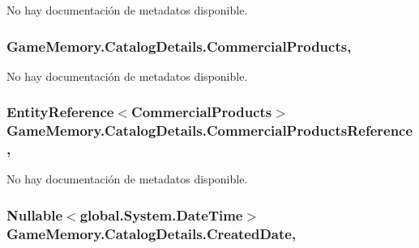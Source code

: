 No hay documentación de metadatos disponible. 

\hypertarget{class_game_memory_1_1_catalog_details_a569b5d7f57651aa9658a60e55bf0ca35}{
\subsubsection[{Commercial\-Products}]{ Game\-Memory.\-Catalog\-Details.\-Commercial\-Products\hspace{0.3cm}{\ttfamily [get]}, {\ttfamily [set]}}}\label{class_game_memory_1_1_catalog_details_a569b5d7f57651aa9658a60e55bf0ca35}


No hay documentación de metadatos disponible. 

\hypertarget{class_game_memory_1_1_catalog_details_a012479cf343ddfd153da97312c957877}{
\subsubsection[{Commercial\-Products\-Reference}]{\setlength{\rightskip}{0pt plus 5cm}Entity\-Reference$<${\bf Commercial\-Products}$>$ Game\-Memory.\-Catalog\-Details.\-Commercial\-Products\-Reference\hspace{0.3cm}{\ttfamily [get]}, {\ttfamily [set]}}}\label{class_game_memory_1_1_catalog_details_a012479cf343ddfd153da97312c957877}


No hay documentación de metadatos disponible. 

\hypertarget{class_game_memory_1_1_catalog_details_aba2001ef444874143cc776f9c81c1b7b}{
\subsubsection[{Created\-Date}]{\setlength{\rightskip}{0pt plus 5cm}Nullable$<$global.\-System.\-Date\-Time$>$ Game\-Memory.\-Catalog\-Details.\-Created\-Date\hspace{0.3cm}{\ttfamily [get]}, {\ttfamily [set]}}}\label{class_game_memory_1_1_catalog_details_aba2001ef444874143cc776f9c81c1b7b}



